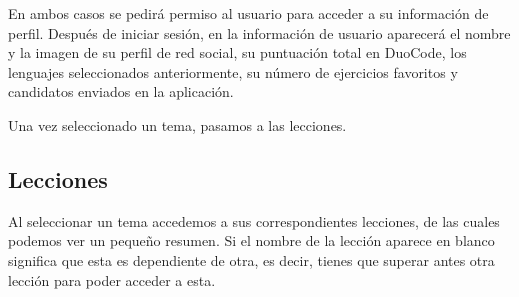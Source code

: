 En ambos casos se pedirá permiso al usuario para acceder a su información de perfil. Después de iniciar sesión, en la información de usuario aparecerá el nombre y la imagen de su perfil de red social, su puntuación total en DuoCode, los lenguajes seleccionados anteriormente, su número de ejercicios favoritos y candidatos enviados en la aplicación. 

\begin{figure}[H]
\begin{center}
\end{center}
\end{figure}

Una vez seleccionado un tema, pasamos a las lecciones.

\subsection{Lecciones}

Al seleccionar un tema accedemos a sus correspondientes lecciones, de las cuales podemos ver un pequeño resumen. Si el nombre de la lección aparece en blanco significa que esta es dependiente de otra, es decir, tienes que superar antes otra lección para poder acceder a esta.

